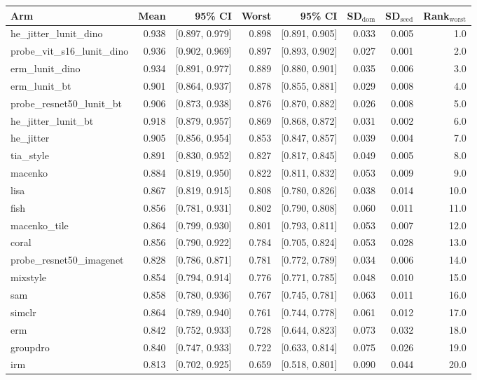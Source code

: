 \begin{tabular}{lrrrrrrr}
\toprule
Arm & Mean & 95\% CI & Worst & 95\% CI & SD$_\text{dom}$ & SD$_\text{seed}$ & Rank$_\text{worst}$ \\
\midrule
he\_jitter\_lunit\_dino & 0.938 & [0.897, 0.979] & 0.898 & [0.891, 0.905] & 0.033 & 0.005 & 1.0 \\
probe\_vit\_s16\_lunit\_dino & 0.936 & [0.902, 0.969] & 0.897 & [0.893, 0.902] & 0.027 & 0.001 & 2.0 \\
erm\_lunit\_dino & 0.934 & [0.891, 0.977] & 0.889 & [0.880, 0.901] & 0.035 & 0.006 & 3.0 \\
erm\_lunit\_bt & 0.901 & [0.864, 0.937] & 0.878 & [0.855, 0.881] & 0.029 & 0.008 & 4.0 \\
probe\_resnet50\_lunit\_bt & 0.906 & [0.873, 0.938] & 0.876 & [0.870, 0.882] & 0.026 & 0.008 & 5.0 \\
he\_jitter\_lunit\_bt & 0.918 & [0.879, 0.957] & 0.869 & [0.868, 0.872] & 0.031 & 0.002 & 6.0 \\
he\_jitter & 0.905 & [0.856, 0.954] & 0.853 & [0.847, 0.857] & 0.039 & 0.004 & 7.0 \\
tia\_style & 0.891 & [0.830, 0.952] & 0.827 & [0.817, 0.845] & 0.049 & 0.005 & 8.0 \\
macenko & 0.884 & [0.819, 0.950] & 0.822 & [0.811, 0.832] & 0.053 & 0.009 & 9.0 \\
lisa & 0.867 & [0.819, 0.915] & 0.808 & [0.780, 0.826] & 0.038 & 0.014 & 10.0 \\
fish & 0.856 & [0.781, 0.931] & 0.802 & [0.790, 0.808] & 0.060 & 0.011 & 11.0 \\
macenko\_tile & 0.864 & [0.799, 0.930] & 0.801 & [0.793, 0.811] & 0.053 & 0.007 & 12.0 \\
coral & 0.856 & [0.790, 0.922] & 0.784 & [0.705, 0.824] & 0.053 & 0.028 & 13.0 \\
probe\_resnet50\_imagenet & 0.828 & [0.786, 0.871] & 0.781 & [0.772, 0.789] & 0.034 & 0.006 & 14.0 \\
mixstyle & 0.854 & [0.794, 0.914] & 0.776 & [0.771, 0.785] & 0.048 & 0.010 & 15.0 \\
sam & 0.858 & [0.780, 0.936] & 0.767 & [0.745, 0.781] & 0.063 & 0.011 & 16.0 \\
simclr & 0.864 & [0.789, 0.940] & 0.761 & [0.744, 0.778] & 0.061 & 0.012 & 17.0 \\
erm & 0.842 & [0.752, 0.933] & 0.728 & [0.644, 0.823] & 0.073 & 0.032 & 18.0 \\
groupdro & 0.840 & [0.747, 0.933] & 0.722 & [0.633, 0.814] & 0.075 & 0.026 & 19.0 \\
irm & 0.813 & [0.702, 0.925] & 0.659 & [0.518, 0.801] & 0.090 & 0.044 & 20.0 \\
\bottomrule
\end{tabular}
